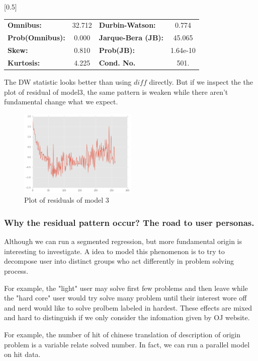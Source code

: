 \documentclass{beamer}
\begin{document}
\begin{frame}
\begin{center}
{\begin{tabular}{lccccc}
\bottomrule
\end{tabular}
}
\scalebox{0.5}[0.5]{
\begin{tabular}{lclc}
\toprule
\textbf{Omnibus:}       & 32.712 & \textbf{  Durbin-Watson:     } &    0.774  \\
\textbf{Prob(Omnibus):} &  0.000 & \textbf{  Jarque-Bera (JB):  } &   45.065  \\
\textbf{Skew:}          &  0.810 & \textbf{  Prob(JB):          } & 1.64e-10  \\
\textbf{Kurtosis:}      &  4.225 & \textbf{  Cond. No.          } &     501.  \\
\bottomrule
\end{tabular}
}
\end{center}

\end{frame}

\begin{frame}

The DW statistic looks better than using $diff$ directly. But if we inspect the the plot of residual of model3, 
the same pattern is weaken while there aren't fundamental change what we expect.

\begin{figure}[h]
\includegraphics[width=0.5\textwidth, inner]{model3-resid.png}
\caption{Plot of residuals of model 3}
\end{figure}

\end{frame}

\begin{frame}

\frametitle{Why the residual pattern occur? The road to user personas. }

Although we can run a segmented regression, but more fundamental origin is interesting to investigate.
A idea to model this phenomenon is to try to decompose user into distinct groups
who act differently in problem solving process. 

For example, the "light" user may solve first few problems and then leave while the "hard core" 
user would try solve many problem until their interest wore off and nerd would like to solve prolbem
labeled in hardest. 
These effects are mixed and hard to distinguish if we only consider the infomation given by OJ website.

For example, the number of hit of chinese translation of description of origin problem is a variable relate 
solved number. In fact, we can run a parallel model on hit data.

\end{frame}
\end{document}
